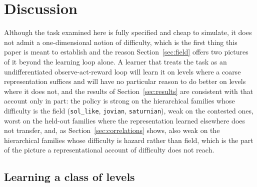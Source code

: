 \documentclass[11pt]{article}
\newcommand{\code}[1]{\texttt{\small #1}}
\begin{document}
\section{Discussion}
\label{sec:discussion}

Although the task examined here is fully specified and cheap to simulate, it
does not admit a one-dimensional notion of difficulty, which is the first
thing this paper is meant to establish and the reason
Section~\ref{sec:field} offers two pictures of it beyond the learning loop
alone. A learner
that treats the task as an undifferentiated observe-act-reward loop will
learn it on levels where a coarse representation suffices and will have no
particular reason to do better on levels where it does not, and the results
of Section~\ref{sec:results} are consistent with that account only in part:
the policy is strong on the hierarchical families whose difficulty is the
field (\code{sol\_like}, \code{jovian}, \code{saturnian}), weak on the
contested ones, worst on the held-out families where the representation
learned elsewhere does not transfer, and, as Section~\ref{sec:correlations}
shows, also weak on the hierarchical families whose difficulty is hazard
rather than field, which is the part of the picture a representational
account of difficulty does not reach.

\subsection{Learning a class of levels}
\end{document}
